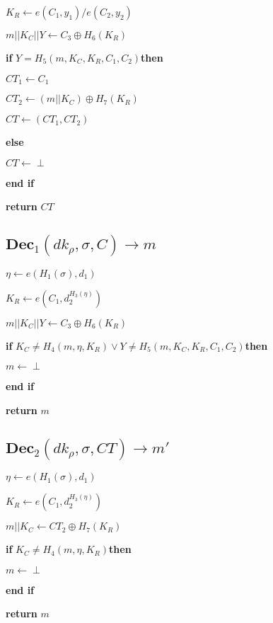\documentclass[a4paper]{article}
\begin{document}
$K_R \gets e(C_1, y_1) / e(C_2, y_2)$

$m || K_C || Y \gets C_3 \oplus H_6(K_R)$

\textbf{if} $Y = H_5(m, K_C, K_R, C_1, C_2) $\textbf{then}

	\quad$\textit{CT}_1 \gets C_1$

	\quad$\textit{CT}_2 \gets (m || K_C) \oplus H_7(K_R)$

	\quad$\textit{CT} \gets (\textit{CT}_1, \textit{CT}_2)$

\textbf{else}

	\quad$\textit{CT} \gets \perp$

\textbf{end if}

\textbf{return} $\textit{CT}$

\subsection{$\textbf{Dec}_1(\textit{dk}_\rho, \sigma, C) \rightarrow m$}

$\eta \gets e(H_1(\sigma), d_1)$

$K_R \gets e(C_1, d_2^{H_3(\eta)})$

$m || K_C || Y \gets C_3 \oplus H_6(K_R)$

\textbf{if} $K_C \neq H_4(m, \eta, K_R) \lor Y \neq H_5(m, K_C, K_R, C_1, C_2) $\textbf{then}

	\quad$m \gets \perp$

\textbf{end if}

\textbf{return} $m$

\subsection{$\textbf{Dec}_2(\textit{dk}_\rho, \sigma, \textit{CT}) \rightarrow m'$}

$\eta \gets e(H_1(\sigma), d_1)$

$K_R \gets e(C_1, d_2^{H_3(\eta)})$

$m || K_C \gets \textit{CT}_2 \oplus H_7(K_R)$

\textbf{if} $K_C \neq H_4(m, \eta, K_R) $\textbf{then}

	\quad$m \gets \perp$

\textbf{end if}

\textbf{return} $m$
\end{document}
